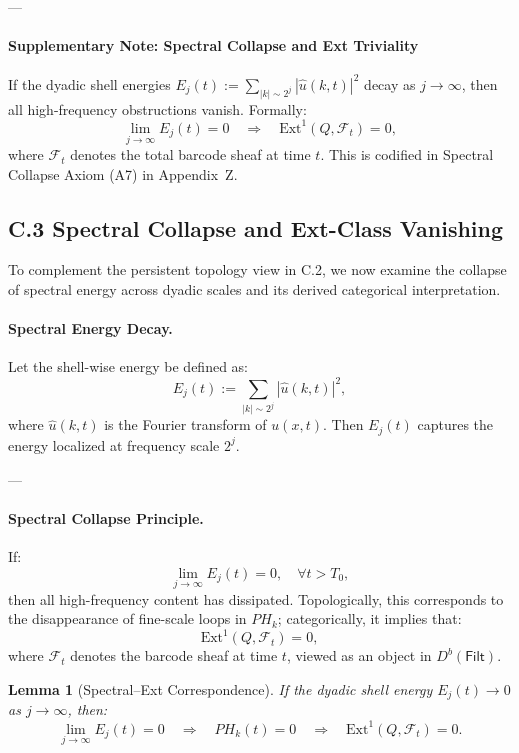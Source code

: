 \documentclass[11pt]{article}
\newtheorem{lemma}[theorem]{Lemma}
\begin{document}
---

\paragraph{Supplementary Note: Spectral Collapse and Ext Triviality}

If the dyadic shell energies \( E_j(t) := \sum_{|k| \sim 2^j} |\widehat{u}(k,t)|^2 \) decay as \( j \to \infty \),  
then all high-frequency obstructions vanish. Formally:
\[
\lim_{j \to \infty} E_j(t) = 0 
\quad \Rightarrow \quad 
\mathrm{Ext}^1(Q, \mathcal{F}_t) = 0,
\]
where \( \mathcal{F}_t \) denotes the total barcode sheaf at time \( t \).  
This is codified in Spectral Collapse Axiom (A7) in Appendix~Z.



\subsection*{C.3 Spectral Collapse and Ext-Class Vanishing}

To complement the persistent topology view in C.2, we now examine the collapse of spectral energy across dyadic scales and its derived categorical interpretation.

\paragraph{Spectral Energy Decay.}
Let the shell-wise energy be defined as:
\[
E_j(t) := \sum_{|k| \sim 2^j} |\widehat{u}(k,t)|^2,
\]
where \( \widehat{u}(k,t) \) is the Fourier transform of \( u(x,t) \).  
Then \( E_j(t) \) captures the energy localized at frequency scale \( 2^j \).  

---

\paragraph{Spectral Collapse Principle.}
If:
\[
\lim_{j \to \infty} E_j(t) = 0, \quad \forall t > T_0,
\]
then all high-frequency content has dissipated.  
Topologically, this corresponds to the disappearance of fine-scale loops in \( PH_k \);  
categorically, it implies that:
\[
\mathrm{Ext}^1(Q, \mathcal{F}_t) = 0,
\]
where \( \mathcal{F}_t \) denotes the barcode sheaf at time \( t \), viewed as an object in \( D^b(\mathsf{Filt}) \).

\begin{lemma}[Spectral–Ext Correspondence]
If the dyadic shell energy \( E_j(t) \to 0 \) as \( j \to \infty \), then:
\[
\lim_{j \to \infty} E_j(t) = 0 
\quad \Rightarrow \quad 
PH_k(t) = 0 
\quad \Rightarrow \quad 
\mathrm{Ext}^1(Q, \mathcal{F}_t) = 0.
\]
\end{lemma}
\end{document}
